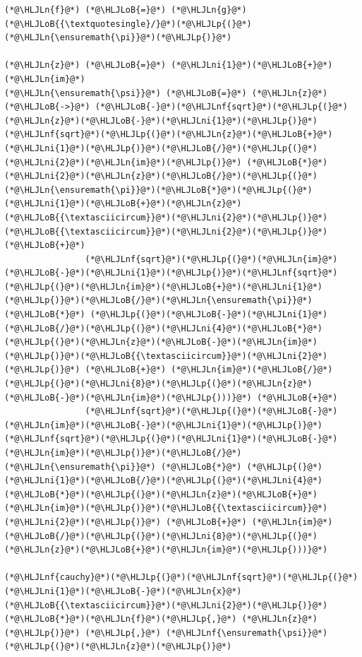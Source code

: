 \documentclass[12pt,a4paper]{article}
\newcommand{\HLJLn}[1]{#1}
\newcommand{\HLJLnf}[1]{\textcolor[RGB]{66,102,213}{#1}}
\newcommand{\HLJLni}[1]{\textcolor[RGB]{59,151,46}{#1}}
\newcommand{\HLJLoB}[1]{\textcolor[RGB]{102,102,102}{\textbf{#1}}}
\newcommand{\HLJLp}[1]{#1}
\begin{document}
\begin{lstlisting}
(*@\HLJLn{f}@*) (*@\HLJLoB{=}@*) (*@\HLJLn{g}@*)(*@\HLJLoB{{\textquotesingle}/}@*)(*@\HLJLp{(}@*)(*@\HLJLn{\ensuremath{\pi}}@*)(*@\HLJLp{)}@*)

(*@\HLJLn{z}@*) (*@\HLJLoB{=}@*) (*@\HLJLni{1}@*)(*@\HLJLoB{+}@*)(*@\HLJLn{im}@*)
(*@\HLJLn{\ensuremath{\psi}}@*) (*@\HLJLoB{=}@*) (*@\HLJLn{z}@*) (*@\HLJLoB{->}@*) (*@\HLJLoB{-}@*)(*@\HLJLnf{sqrt}@*)(*@\HLJLp{(}@*)(*@\HLJLn{z}@*)(*@\HLJLoB{-}@*)(*@\HLJLni{1}@*)(*@\HLJLp{)}@*)(*@\HLJLnf{sqrt}@*)(*@\HLJLp{(}@*)(*@\HLJLn{z}@*)(*@\HLJLoB{+}@*)(*@\HLJLni{1}@*)(*@\HLJLp{)}@*)(*@\HLJLoB{/}@*)(*@\HLJLp{(}@*)(*@\HLJLni{2}@*)(*@\HLJLn{im}@*)(*@\HLJLp{)}@*) (*@\HLJLoB{*}@*) (*@\HLJLni{2}@*)(*@\HLJLn{z}@*)(*@\HLJLoB{/}@*)(*@\HLJLp{(}@*)(*@\HLJLn{\ensuremath{\pi}}@*)(*@\HLJLoB{*}@*)(*@\HLJLp{(}@*)(*@\HLJLni{1}@*)(*@\HLJLoB{+}@*)(*@\HLJLn{z}@*)(*@\HLJLoB{{\textasciicircum}}@*)(*@\HLJLni{2}@*)(*@\HLJLp{)}@*)(*@\HLJLoB{{\textasciicircum}}@*)(*@\HLJLni{2}@*)(*@\HLJLp{)}@*) (*@\HLJLoB{+}@*) 
                (*@\HLJLnf{sqrt}@*)(*@\HLJLp{(}@*)(*@\HLJLn{im}@*)(*@\HLJLoB{-}@*)(*@\HLJLni{1}@*)(*@\HLJLp{)}@*)(*@\HLJLnf{sqrt}@*)(*@\HLJLp{(}@*)(*@\HLJLn{im}@*)(*@\HLJLoB{+}@*)(*@\HLJLni{1}@*)(*@\HLJLp{)}@*)(*@\HLJLoB{/}@*)(*@\HLJLn{\ensuremath{\pi}}@*) (*@\HLJLoB{*}@*) (*@\HLJLp{(}@*)(*@\HLJLoB{-}@*)(*@\HLJLni{1}@*)(*@\HLJLoB{/}@*)(*@\HLJLp{(}@*)(*@\HLJLni{4}@*)(*@\HLJLoB{*}@*)(*@\HLJLp{(}@*)(*@\HLJLn{z}@*)(*@\HLJLoB{-}@*)(*@\HLJLn{im}@*)(*@\HLJLp{)}@*)(*@\HLJLoB{{\textasciicircum}}@*)(*@\HLJLni{2}@*)(*@\HLJLp{)}@*) (*@\HLJLoB{+}@*) (*@\HLJLn{im}@*)(*@\HLJLoB{/}@*)(*@\HLJLp{(}@*)(*@\HLJLni{8}@*)(*@\HLJLp{(}@*)(*@\HLJLn{z}@*)(*@\HLJLoB{-}@*)(*@\HLJLn{im}@*)(*@\HLJLp{)))}@*) (*@\HLJLoB{+}@*) 
                (*@\HLJLnf{sqrt}@*)(*@\HLJLp{(}@*)(*@\HLJLoB{-}@*)(*@\HLJLn{im}@*)(*@\HLJLoB{-}@*)(*@\HLJLni{1}@*)(*@\HLJLp{)}@*)(*@\HLJLnf{sqrt}@*)(*@\HLJLp{(}@*)(*@\HLJLni{1}@*)(*@\HLJLoB{-}@*)(*@\HLJLn{im}@*)(*@\HLJLp{)}@*)(*@\HLJLoB{/}@*)(*@\HLJLn{\ensuremath{\pi}}@*) (*@\HLJLoB{*}@*) (*@\HLJLp{(}@*)(*@\HLJLni{1}@*)(*@\HLJLoB{/}@*)(*@\HLJLp{(}@*)(*@\HLJLni{4}@*)(*@\HLJLoB{*}@*)(*@\HLJLp{(}@*)(*@\HLJLn{z}@*)(*@\HLJLoB{+}@*)(*@\HLJLn{im}@*)(*@\HLJLp{)}@*)(*@\HLJLoB{{\textasciicircum}}@*)(*@\HLJLni{2}@*)(*@\HLJLp{)}@*) (*@\HLJLoB{+}@*) (*@\HLJLn{im}@*)(*@\HLJLoB{/}@*)(*@\HLJLp{(}@*)(*@\HLJLni{8}@*)(*@\HLJLp{(}@*)(*@\HLJLn{z}@*)(*@\HLJLoB{+}@*)(*@\HLJLn{im}@*)(*@\HLJLp{)))}@*)

(*@\HLJLnf{cauchy}@*)(*@\HLJLp{(}@*)(*@\HLJLnf{sqrt}@*)(*@\HLJLp{(}@*)(*@\HLJLni{1}@*)(*@\HLJLoB{-}@*)(*@\HLJLn{x}@*)(*@\HLJLoB{{\textasciicircum}}@*)(*@\HLJLni{2}@*)(*@\HLJLp{)}@*)(*@\HLJLoB{*}@*)(*@\HLJLn{f}@*)(*@\HLJLp{,}@*) (*@\HLJLn{z}@*)(*@\HLJLp{)}@*) (*@\HLJLp{,}@*) (*@\HLJLnf{\ensuremath{\psi}}@*)(*@\HLJLp{(}@*)(*@\HLJLn{z}@*)(*@\HLJLp{)}@*)
\end{lstlisting}
\end{document}
